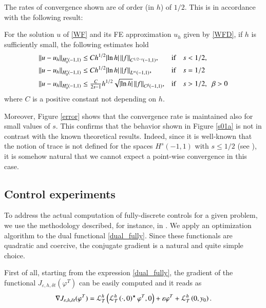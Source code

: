 The rates of convergence shown are of order (in $h$) of $1/2$. This is in accordance with the following result: 
\begin{theorem}
For the solution $u$ of \eqref{WF} and its FE approximation $u_h$ given by \eqref{WFD}, if $h$ is sufficiently small, the following estimates hold
\begin{align*}
	&{\left\|u-u_h\right\|}_{H^s_0(-1,1)}\leq C h^{1/2}|\!\ln h|\,{\left\|f\right\|}_{C^{1/2-s}(-1,1)},& &\textnormal{if}\quad s<1/2, 
	\\
	&{\left\|u-u_h\right\|}_{H^s_0(-1,1)}\leq C h^{1/2} |\!\ln h|\, {\left\|f\right\|}_{L^\infty(-1,1)},& &\textnormal{if}\quad  s=1/2 
	\\
	&{\left\|u-u_h\right\|}_{H^s_0(-1,1)}\leq \tfrac{C}{2s-1} h^{1/2} \sqrt{|\!\ln h|}\, {\left\|f\right\|}_{C^\beta(-1,1)},& &\textnormal{if} \quad s>1/2,\;\;\beta>0
\end{align*}
where $C$ is a positive constant not depending on $h$. 
\end{theorem}

Moreover, Figure \ref{error} shows that the convergence rate is maintained also for small values of $s$. This confirms that the behavior shown in Figure \ref{s01a} is not in contrast with the known theoretical results. Indeed, since it is well-known that the notion of trace is not defined for the spaces $H^s(-1,1)$ with $s\leq 1/2$ (see \cite{jllions1972non,tartar2007introduction}), it is somehow natural that we cannot expect a point-wise convergence in this case.  

\subsection{Control experiments}\label{control_exp}

To address the actual computation of fully-discrete controls for a given problem, we use the methodology described, for instance, in \cite{glowinski2008exact}. We apply an optimization algorithm to the dual functional \eqref{dual_fully}. Since these functionals are quadratic and coercive, the conjugate gradient is a natural and quite simple choice.

First of all, starting from the expression \eqref{dual_fully}, the gradient of the functional $J_{\varepsilon,h,\delta t}(\varphi^T)$ can be easily computed and it reads as
\begin{align*}
	\nabla J_{\varepsilon,h,\delta t}(\varphi^T) = \mathcal{L}^h_T\left(\mathcal{L}^h_T\left(\cdot,0\right)^\star\varphi^T,0\right) +  \varepsilon\varphi^T + \mathcal{L}^h_T\left(0,y_0\right).
\end{align*}

